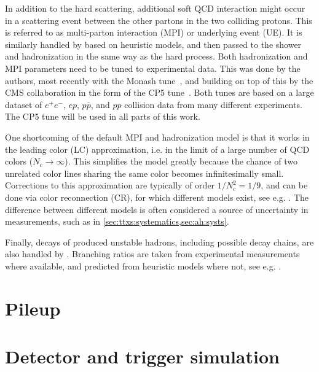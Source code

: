 In addition to the hard scattering, additional soft QCD interaction might occur in a scattering event between the other partons in the two colliding protons. This is referred to as multi-parton interaction (MPI) or underlying event (UE). It is similarly handled by \pythia based on heuristic models, and then passed to the shower and hadronization in the same way as the hard process. Both hadronization and MPI parameters need to be tuned to experimental data. This was done by the \pythia authors, most recently with the Monash tune~\cite{Skands:2014pea}, and building on top of this by the CMS collaboration in the form of the CP5 tune~\cite{CMS:GEN-17-001}. Both tunes are based on a large dataset of $e^+e^-$, $ep$, $p\bar{p}$, and $pp$ collision data from many different experiments. The CP5 tune will be used in all parts of this work.

One shortcoming of the default MPI and hadronization model is that it works in the leading color (LC) approximation, i.e. in the limit of a large number of QCD colors ($N_c \rightarrow \infty$). This simplifies the model greatly because the chance of two unrelated color lines sharing the same color becomes infinitesimally small. Corrections to this approximation are typically of order $1/N_c^2 = 1/9$, and can be done via color reconnection (CR), for which different models exist, see e.g. . The difference between different models is often considered a source of uncertainty in measurements, such as in \cref{sec:ttxs:systematics,sec:ah:systs}.

Finally, decays of produced unstable hadrons, including possible decay chains, are also handled by \pythia. Branching ratios are taken from experimental measurements where available, and predicted from heuristic models where not, see e.g. .

\section{Pileup}
\label{sec:mc:pileup}



\section{Detector and trigger simulation}
\label{sec:mc:detector}
